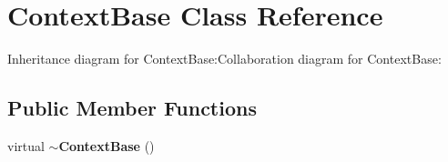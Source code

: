 \section{ContextBase Class Reference}
\label{classbr_1_1pucrio_1_1telemidia_1_1ginga_1_1ncl_1_1adaptation_1_1context_1_1ContextBase}
Inheritance diagram for ContextBase:Collaboration diagram for ContextBase:\subsection*{Public Member Functions}
\begin{CompactItemize}
\item 
virtual {\bf $\sim$ContextBase} ()\label{classbr_1_1pucrio_1_1telemidia_1_1ginga_1_1ncl_1_1adaptation_1_1context_1_1ContextBase_2cf5ab2871153670856e79dd1d8a7148}

\end{CompactItemize}
